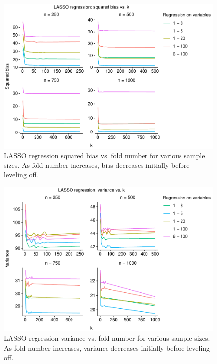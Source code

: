 \documentclass[
  12pt,
]{article}
\begin{document}
\begin{figure}[H]

{\centering \includegraphics{manuscript_files/figure-latex/unnamed-chunk-4-1} 

}

\caption{LASSO regression squared bias vs. fold number for various sample sizes. As fold number increases, bias decreases initially before leveling off.}\label{fig:unnamed-chunk-4}
\end{figure}

\begin{figure}[H]

{\centering \includegraphics{manuscript_files/figure-latex/unnamed-chunk-5-1} 

}

\caption{LASSO regression variance vs. fold number for various sample sizes. As fold number increases, variance decreases initially before leveling off.}\label{fig:unnamed-chunk-5}
\end{figure}
\end{document}
